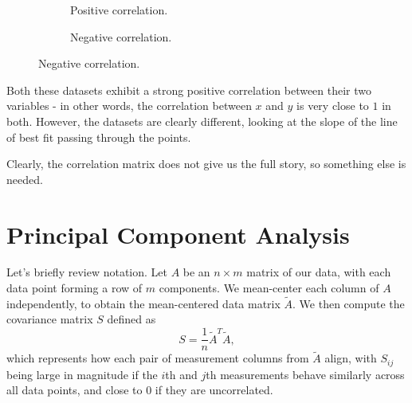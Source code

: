 \documentclass[letterpaper]{article}
\theoremstyle{remark}
\renewcommand{\tilde}[1]{\widetilde{#1}}
\begin{document}
\begin{figure}[H]
\centering
\begin{subfigure}{.5\textwidth}
\centering
{}
\caption{Positive correlation.}
\end{subfigure}%
\begin{subfigure}{.5\textwidth}
\centering
{}
\caption{Negative correlation.}
\end{subfigure}
\captionsetup{labelformat=empty}
\end{figure}
Both these datasets exhibit a strong positive correlation between their two variables - in other words, the correlation between $x$ and $y$ is very close to $1$ in both. However, the datasets are clearly different, looking at the slope of the line of best fit passing through the points.

Clearly, the correlation matrix does not give us the full story, so something else is needed.

\section{Principal Component Analysis}
Let's briefly review notation. Let $A$ be an $n \times m$ matrix of our data, with each data point forming a row of $m$ components. We mean-center each column of $A$ independently, to obtain the mean-centered data matrix $\tilde{A}$. We then compute the covariance matrix $S$ defined as
\[
    S = \frac{1}{n}\tilde{A}^T\tilde{A},
\]
which represents how each pair of measurement columns from $\tilde{A}$ align, with $S_{ij}$ being large in magnitude if the $i$th and $j$th measurements behave similarly across all data points, and close to $0$ if they are uncorrelated. 
\end{document}
